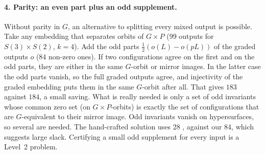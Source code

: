 \documentclass[11pt]{article}
\theoremstyle{definition}
\theoremstyle{remark}
\begin{document}
\paragraph{4. Parity: an even part plus an odd supplement.}
Without parity in $G$, an alternative to splitting every mixed output is
possible. Take any embedding that separates orbits of $G \times P$ (99 outputs
for $S(3)\times S(2)$, $k=4$). Add the odd parts
$\tfrac12(o(L) - o(pL))$ of the graded outputs $o$ (84 non-zero ones). If
two configurations agree on the first and on the odd parts, they are either in
the same $G$-orbit or mirror images. In the latter case the odd parts vanish,
so the full graded outputs agree, and injectivity of the graded embedding puts
them in the same $G$-orbit after all. That gives $183$ against $184$, a small
saving. What is really needed is only a set of odd invariants whose common
zero set (on $G\times P$-orbits) is exactly the set of configurations that are
$G$-equivalent to their mirror image. Odd invariants vanish on hypersurfaces,
so several are needed. The hand-crafted solution uses 28 \cite{LHG22}, against
our 84, which suggests large slack. Certifying a small odd supplement for
every input is a Level~2 problem.
\end{document}
